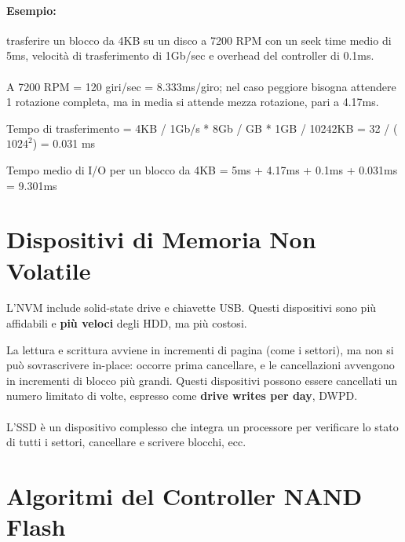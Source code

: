 \paragraph{Esempio: } trasferire un blocco da 4KB su un disco a 7200 RPM con un seek time medio di 5ms, velocità di trasferimento di 1Gb/sec e overhead del controller di 0.1ms.

\paragraph{}
A 7200 RPM = 120 giri/sec = 8.333ms/giro; nel caso peggiore bisogna attendere 1 rotazione completa, ma in media si attende mezza rotazione, pari a 4.17ms.


Tempo di trasferimento = 4KB / 1Gb/s * 8Gb / GB * 1GB / 10242KB = 32 / ($1024^2$) = 0.031 ms

Tempo medio di I/O per un blocco da 4KB = 5ms + 4.17ms + 0.1ms + 0.031ms = 9.301ms

\section{Dispositivi di Memoria Non Volatile}

L'NVM include solid-state drive e chiavette USB. Questi dispositivi sono più affidabili e \textbf{più veloci} degli HDD, ma più costosi.

La lettura e scrittura avviene in incrementi di pagina (come i settori), ma non si può sovrascrivere in-place: occorre prima cancellare, e le cancellazioni avvengono in incrementi di blocco più grandi. Questi dispositivi possono essere cancellati un numero limitato di volte, espresso come \textbf{drive writes per day}, DWPD.

\paragraph{}
L'SSD è un dispositivo complesso che integra un processore per verificare lo stato di tutti i settori, cancellare e scrivere blocchi, ecc.

\section{Algoritmi del Controller NAND Flash}



